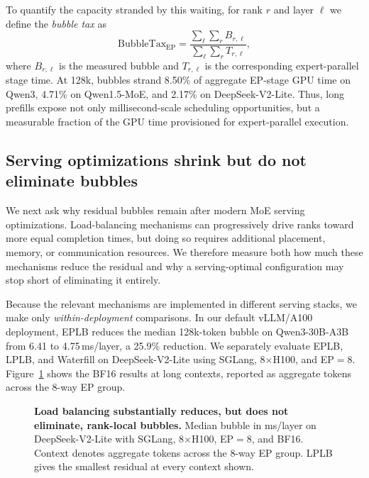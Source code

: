 To quantify the capacity stranded by this waiting, for rank $r$ and layer
$\ell$ we define the \emph{bubble tax} as
\[
  \mathrm{BubbleTax}_{\mathrm{EP}}
  =
  \frac{\sum_{\ell}\sum_r B_{r,\ell}}
  {\sum_{\ell}\sum_r T_{r,\ell}},
\]
where $B_{r,\ell}$ is the measured bubble and $T_{r,\ell}$ is the
corresponding expert-parallel stage time. At 128k, bubbles strand
8.50\% of aggregate \ac{EP}-stage GPU time on Qwen3, 4.71\% on
Qwen1.5-MoE, and 2.17\% on DeepSeek-V2-Lite. Thus, long prefills expose
not only millisecond-scale scheduling opportunities, but a measurable
fraction of the GPU time provisioned for expert-parallel execution.

\subsection{Serving optimizations shrink but do not eliminate bubbles}
\label{sec:char-optimizations}

We next ask why residual bubbles remain after modern \ac{MoE} serving
optimizations. Load-balancing mechanisms can progressively drive ranks
toward more equal completion times, but doing so requires additional
placement, memory, or communication resources. We therefore measure both
how much these mechanisms reduce the residual and why a serving-optimal
configuration may stop short of eliminating it entirely.

Because the relevant mechanisms are implemented in different serving
stacks, we make only \emph{within-deployment} comparisons. In our
default vLLM/A100 deployment, EPLB reduces the median 128k-token bubble
on Qwen3-30B-A3B from 6.41 to 4.75\,ms/layer, a 25.9\% reduction.
We separately evaluate EPLB, LPLB, and Waterfill on DeepSeek-V2-Lite
using SGLang, 8$\times$H100, and \ac{EP}$=8$. Figure~\ref{fig:lb-sweep}
shows the BF16 results at long contexts, reported as aggregate tokens
across the 8-way \ac{EP} group.

\begin{figure}[t]
  \centering
  \caption{
    \textbf{Load balancing substantially reduces, but does not eliminate,
    rank-local bubbles.}
    Median bubble in ms/layer on DeepSeek-V2-Lite with SGLang,
    8$\times$H100, \ac{EP}$=8$, and BF16. Context denotes aggregate tokens
    across the 8-way \ac{EP} group. LPLB gives the smallest residual at
    every context shown.
  }
  \label{fig:lb-sweep}
\end{figure}

